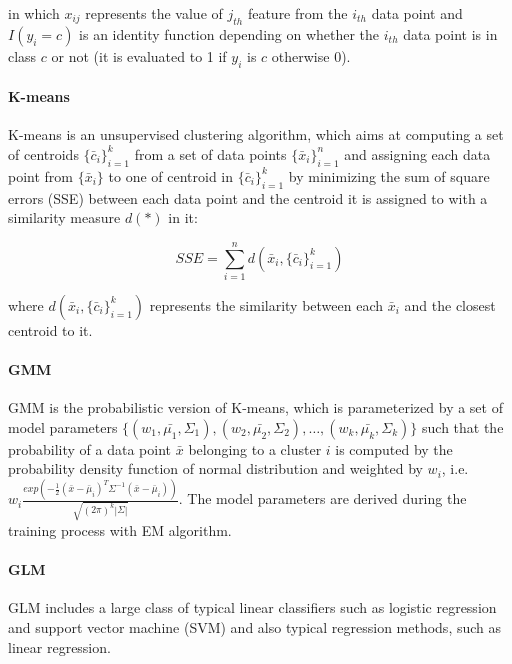 in which $x_{ij}$ represents the value of $j_{th}$ feature from the $i_{th}$ data point and $I(y_i=c)$ is an identity function depending on whether the $i_{th}$ data point is in class $c$ or not (it is evaluated to 1 if $y_i$ is $c$ otherwise 0).

\paragraph{K-means} K-means is an unsupervised clustering algorithm, which aims at computing a set of centroids $\{\bar{c}_i\}_{i=1}^k$ from a set of data points $\{\bar{x}_i\}_{i=1}^n$ and assigning each data point from $\{\bar{x}_i\}$ to one of centroid in $\{\bar{c}_i\}_{i=1}^k$ by minimizing the sum of square errors (SSE) between each data point and the centroid it is assigned to with a similarity measure $d(*)$ in it:

\begin{equation}\label{eq: sse_k_means}
    SSE = \sum_{i=1}^nd(\bar{x}_i, \{\bar{c}_i\}_{i=1}^k)
\end{equation}

where $d(\bar{x}_i, \{\bar{c}_i\}_{i=1}^k)$ represents the similarity between each $\bar{x}_i$ and the closest centroid to it.

\paragraph{GMM} GMM is the probabilistic version of K-means, which is parameterized by a set of model parameters $\{(w_1, \bar{\mu_1}, \Sigma_1), (w_2, \bar{\mu_2}, \Sigma_2), \dots, (w_k, \bar{\mu_k}, \Sigma_k)\}$ such that the probability of a data point $\bar{x}$ belonging to a cluster $i$ is computed by the probability density function of normal distribution and weighted by $w_i$, i.e.  $w_i\frac{exp(-\frac{1}{2}(\bar{x}-\bar{\mu}_i)^T\Sigma^{-1}(\bar{x}-\bar{\mu}_i))}{\sqrt{(2\pi)^k|\Sigma|}}$. The model parameters are derived during the training process with EM algorithm.

\paragraph{GLM} GLM includes a large class of typical linear classifiers such as logistic regression and support vector machine (SVM) and also typical regression methods, such as linear regression.